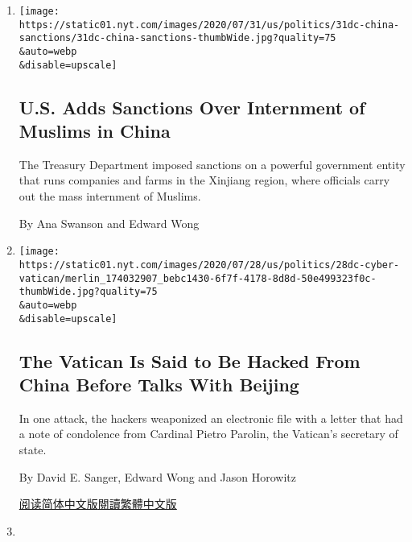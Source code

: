 \begin{enumerate}
\def\labelenumi{\arabic{enumi}.}
\item
  \href{/2020/07/31/us/politics/sanctions-china-xinjiang-uighurs.html}{}

  \texttt{[image: https://static01.nyt.com/images/2020/07/31/us/politics/31dc-china-sanctions/31dc-china-sanctions-thumbWide.jpg?quality=75\\\&auto=webp\\\&disable=upscale]}

  \hypertarget{us-adds-sanctions-over-internment-of-muslims-in-china}{%
  \subsection{U.S. Adds Sanctions Over Internment of Muslims in
  China}\label{us-adds-sanctions-over-internment-of-muslims-in-china}}

  The Treasury Department imposed sanctions on a powerful government
  entity that runs companies and farms in the Xinjiang region, where
  officials carry out the mass internment of Muslims.

  By Ana Swanson and Edward Wong
\item
  \href{/2020/07/28/us/politics/china-vatican-hack.html}{}

  \texttt{[image: https://static01.nyt.com/images/2020/07/28/us/politics/28dc-cyber-vatican/merlin\_174032907\_bebc1430-6f7f-4178-8d8d-50e499323f0c-thumbWide.jpg?quality=75\\\&auto=webp\\\&disable=upscale]}

  \hypertarget{the-vatican-is-said-to-be-hacked-from-china-before-talks-with-beijing}{%
  \subsection{The Vatican Is Said to Be Hacked From China Before Talks
  With
  Beijing}\label{the-vatican-is-said-to-be-hacked-from-china-before-talks-with-beijing}}

  In one attack, the hackers weaponized an electronic file with a letter
  that had a note of condolence from Cardinal Pietro Parolin, the
  Vatican's secretary of state.

  By David E. Sanger, Edward Wong and Jason Horowitz

  \href{https://cn.nytimes.com/world/20200729/china-vatican-hack/}{阅读简体中文版}\href{https://cn.nytimes.com/world/20200729/china-vatican-hack/zh-hant/}{閱讀繁體中文版}
\item
  \href{/2020/07/25/world/asia/us-china-trump-xi.html}{}


\end{enumerate}
